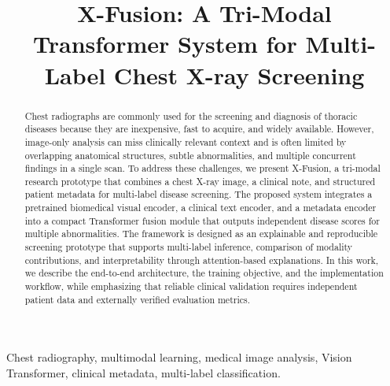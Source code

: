 \documentclass[conference,a4paper]{IEEEtran}
\begin{document}
\title{X-Fusion: A Tri-Modal Transformer System for Multi-Label Chest X-ray Screening}

\author{
}

\maketitle

\begin{abstract}
Chest radiographs are commonly used for the screening and diagnosis of thoracic diseases because they are inexpensive, fast to acquire, and widely available. However, image-only analysis can miss clinically relevant context and is often limited by overlapping anatomical structures, subtle abnormalities, and multiple concurrent findings in a single scan. To address these challenges, we present X-Fusion, a tri-modal research prototype that combines a chest X-ray image, a clinical note, and structured patient metadata for multi-label disease screening. The proposed system integrates a pretrained biomedical visual encoder, a clinical text encoder, and a metadata encoder into a compact Transformer fusion module that outputs independent disease scores for multiple abnormalities. The framework is designed as an explainable and reproducible screening prototype that supports multi-label inference, comparison of modality contributions, and interpretability through attention-based explanations. In this work, we describe the end-to-end architecture, the training objective, and the implementation workflow, while emphasizing that reliable clinical validation requires independent patient data and externally verified evaluation metrics.
\end{abstract}

\begin{IEEEkeywords}
Chest radiography, multimodal learning, medical image analysis, Vision Transformer, clinical metadata, multi-label classification.
\end{IEEEkeywords}
\end{document}
